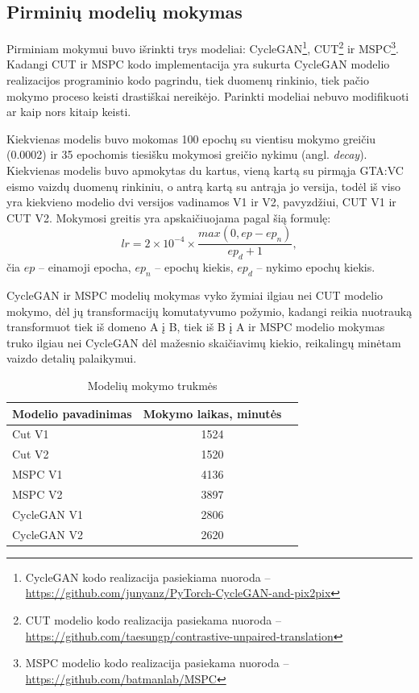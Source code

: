 \documentclass{VUMIFPSbakalaurinis}
\begin{document}
    \subsection{Pirminių modelių mokymas}
        Pirminiam mokymui buvo išrinkti trys modeliai: CycleGAN\footnote{CycleGAN kodo realizacija pasiekiama nuoroda – \href{https://github.com/junyanz/PyTorch-CycleGAN-and-pix2pix}{https://github.com/junyanz/PyTorch-CycleGAN-and-pix2pix}}, CUT\footnote{CUT modelio kodo realizacija pasiekama nuoroda – \href{https://github.com/taesungp/contrastive-unpaired-translation}{https://github.com/taesungp/contrastive-unpaired-translation}} ir MSPC\footnote{MSPC modelio kodo realizacija pasiekama nuoroda – \href{https://github.com/batmanlab/MSPC}{https://github.com/batmanlab/MSPC}}. Kadangi CUT ir MSPC kodo implementacija yra sukurta CycleGAN modelio realizacijos programinio kodo pagrindu, tiek duomenų rinkinio, tiek pačio mokymo proceso keisti drastiškai nereikėjo. Parinkti modeliai nebuvo modifikuoti ar kaip nors kitaip keisti.

        Kiekvienas modelis buvo mokomas 100 epochų su vientisu mokymo greičiu (0.0002) ir 35 epochomis tiesišku mokymosi greičio nykimu (angl. \emph{decay}).  Kiekvienas modelis buvo apmokytas du kartus, vieną kartą su pirmąja GTA:VC eismo vaizdų duomenų rinkiniu, o antrą kartą su antrąja jo versija, todėl iš viso yra kiekvieno modelio dvi versijos vadinamos V1 ir V2, pavyzdžiui, CUT V1 ir CUT V2. Mokymosi greitis yra apskaičiuojama pagal šią formulę:
        \[ lr = 2\times10^{-4} \times \frac{ max(0, ep - ep_n)}{ep_d + 1},\] čia $ep$ – einamoji epocha, $ep_{n}$ – epochų kiekis, $ep_{d}$ – nykimo epochų kiekis.

        CycleGAN ir MSPC modelių mokymas vyko žymiai ilgiau nei CUT modelio mokymo, dėl jų transformacijų komutatyvumo požymio, kadangi reikia nuotrauką transformuot tiek iš domeno A į B, tiek iš B į A ir MSPC modelio mokymas truko ilgiau nei CycleGAN dėl mažesnio skaičiavimų kiekio, reikalingų minėtam vaizdo detalių palaikymui.
        \begin{table}[H]\footnotesize
          \centering
          \caption{Modelių mokymo trukmės}
          {\begin{tabular}{|l|c|c|} \hline
            Modelio pavadinimas & Mokymo laikas, minutės\\
            \hline
            Cut V1 & 1524 \\
            Cut V2 & 1520 \\ 
            MSPC V1 & 4136 \\
            MSPC V2 & 3897 \\
            CycleGAN V1 & 2806 \\
            CycleGAN V2 & 2620 \\
            \hline
          \end{tabular}}
          \label{tab:table example}
        \end{table}
\end{document}
